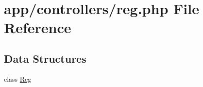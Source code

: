 \hypertarget{controllers_2reg_8php}{}\section{app/controllers/reg.php File Reference}
\label{controllers_2reg_8php}
\subsection*{Data Structures}
\begin{DoxyCompactItemize}
\item 
class \hyperlink{classReg}{Reg}
\end{DoxyCompactItemize}
